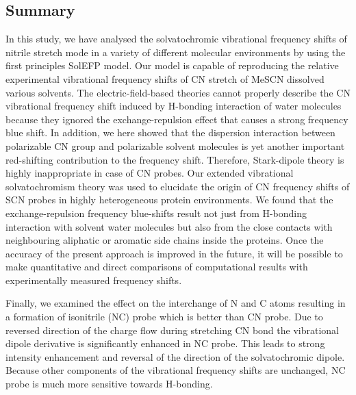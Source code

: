 \documentclass[a4paper,titlepage,twoside,fleqn,12pt]{book}
\begin{document}
\begin{refsection}
\section{Summary}

In this study, we have analysed the solvatochromic vibrational
frequency shifts of nitrile stretch mode in a variety of different
molecular environments by using the first principles SolEFP
model. Our model is
capable of reproducing the relative experimental vibrational
frequency shifts of CN stretch of MeSCN dissolved various solvents. 
The
electric\hyp{}field\hyp{}based theories cannot properly describe the CN
vibrational frequency shift induced by H-bonding interaction of
water molecules because they ignored the exchange\hyp{}repulsion
effect that causes a strong frequency blue shift.
In addition, we here showed that the dispersion interaction
between polarizable CN group and polarizable solvent
molecules is yet another important red\hyp{}shifting contribution to
the frequency shift. Therefore, Stark\hyp{}dipole
theory is highly inappropriate in case of CN probes. 
Our extended vibrational solvatochromism
theory was used to elucidate the origin of CN frequency shifts
of SCN probes in highly heterogeneous protein environments. We found that 
the exchange\hyp{}repulsion frequency
blue\hyp{}shifts result not just from H-bonding interaction with
solvent water molecules but also from the close contacts with
neighbouring aliphatic or aromatic side chains inside the
proteins. Once the accuracy of the present
approach is improved in the future, it will be possible to make
quantitative and direct comparisons of computational results
with experimentally measured frequency shifts. 

Finally, we examined the effect on the interchange of N and C
atoms resulting in a formation of isonitrile (NC) probe
which is better than CN probe. Due to reversed direction
of the charge flow during stretching CN bond the vibrational
dipole derivative is significantly enhanced in NC probe.
This leads to strong intensity enhancement and reversal
of the direction of the solvatochromic dipole. Because other
components of the vibrational frequency shifts are unchanged,
NC probe is much more sensitive towards H-bonding.

\printbibliography[heading=subbibintoc,title={References}]
\end{refsection}

\end{document}
